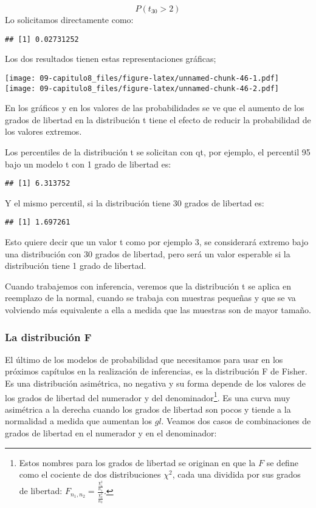 \documentclass[]{article}
\let\rmarkdownfootnote\footnote%
\def\footnote{\protect\rmarkdownfootnote}
\begin{document}
\[P(t_{30} > 2)\] Lo solicitamos directamente como:

\begin{verbatim}
## [1] 0.02731252
\end{verbatim}

Los dos resultados tienen estas representaciones gráficas;

\texttt{[image: 09-capitulo8\_files/figure-latex/unnamed-chunk-46-1.pdf]}
\texttt{[image: 09-capitulo8\_files/figure-latex/unnamed-chunk-46-2.pdf]}

En los gráficos y en los valores de las probabilidades se ve que el
aumento de los grados de libertad en la distribución t tiene el efecto
de reducir la probabilidad de los valores extremos.

Los percentiles de la distribución t se solicitan con qt, por ejemplo,
el percentil 95 bajo un modelo t con 1 grado de libertad es:

\begin{verbatim}
## [1] 6.313752
\end{verbatim}

Y el mismo percentil, si la distribución tiene 30 grados de libertad es:

\begin{verbatim}
## [1] 1.697261
\end{verbatim}

Esto quiere decir que un valor t como por ejemplo 3, se considerará
extremo bajo una distribución con 30 grados de libertad, pero será un
valor esperable si la distribución tiene 1 grado de libertad.

Cuando trabajemos con inferencia, veremos que la distribución t se
aplica en reemplazo de la normal, cuando se trabaja con muestras
pequeñas y que se va volviendo más equivalente a ella a medida que las
muestras son de mayor tamaño.

\hypertarget{la-distribuciuxf3n-f}{%
\subsubsection{La distribución F}\label{la-distribuciuxf3n-f}}

El último de los modelos de probabilidad que necesitamos para usar en
los próximos capítulos en la realización de inferencias, es la
distribución F de Fisher. Es una distribución asimétrica, no negativa y
su forma depende de los valores de los grados de libertad del numerador
y del denominador\footnote{Estos nombres para los grados de libertad se
  originan en que la \(F\) se define como el cociente de dos
  distribuciones \(\chi^{2}\), cada una dividida por sus grados de
  libertad:
  \(F_{n_{1},n_{2}} = \frac{\frac{\chi_{1}^{2}}{n_{1}}}{\frac{\chi_{2}^{2}}{n_{2}}}\).}.
Es una curva muy asimétrica a la derecha cuando los grados de libertad
son pocos y tiende a la normalidad a medida que aumentan los \(gl\).
Veamos dos casos de combinaciones de grados de libertad en el numerador
y en el denominador:
\end{document}

